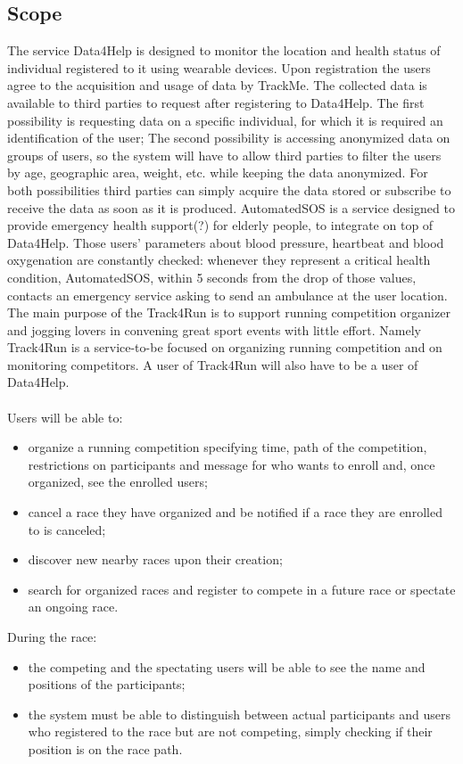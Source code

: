\subsection{Scope}
The service Data4Help is designed to monitor the location and health status of individual registered to it using wearable devices. Upon registration the users agree to the acquisition and usage of data by TrackMe. 
The collected data is available to third parties to request after registering to Data4Help. The first possibility is requesting data on a specific individual, for which it is required an identification of the user; The second possibility is accessing anonymized data on groups of users, so the system will have to allow third parties to filter the users by age, geographic area, weight, etc. while keeping the data anonymized.
For both possibilities third parties can simply acquire the data stored or subscribe to receive the data as soon as it is produced.
AutomatedSOS is a service designed to provide emergency health support(?) for elderly people, to integrate on top of Data4Help. Those users’ parameters about blood pressure, heartbeat and blood oxygenation are constantly checked: whenever they represent a critical health condition, AutomatedSOS, within 5 seconds from the drop of those values, contacts an emergency service asking to send an ambulance at the user location.
The main purpose of the Track4Run is to support running competition organizer and jogging lovers in convening great sport events with little effort. Namely Track4Run is a service-to-be focused on organizing running competition and on monitoring competitors. A user of Track4Run will also have to be a user of Data4Help. 
\\ \\Users will be able to: 
\begin{itemize}
\item 
organize a running competition specifying time, path of the competition, restrictions on participants and message for who wants to enroll and, once organized, see the enrolled users; 
\item 
cancel a race they have organized and be notified if a race they are enrolled to is canceled; 
\item 
discover new nearby races upon their creation; 
\item 
search for organized races and register to compete in a future race or spectate an ongoing race.
\end{itemize}
During the race: 
\begin{itemize}
\item 
the competing and the spectating users will be able to see the name and positions of the participants; 
\item 
the system must be able to distinguish between actual participants and users who registered to the race but are not competing, simply checking if their position is on the race path.
\end{itemize}

